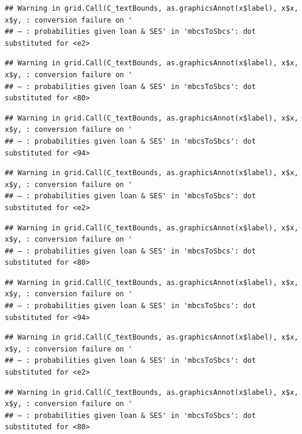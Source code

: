\documentclass[]{article}
\begin{document}
\begin{verbatim}
## Warning in grid.Call(C_textBounds, as.graphicsAnnot(x$label), x$x, x$y, : conversion failure on '
## — : probabilities given loan & SES' in 'mbcsToSbcs': dot substituted for <e2>
\end{verbatim}

\begin{verbatim}
## Warning in grid.Call(C_textBounds, as.graphicsAnnot(x$label), x$x, x$y, : conversion failure on '
## — : probabilities given loan & SES' in 'mbcsToSbcs': dot substituted for <80>
\end{verbatim}

\begin{verbatim}
## Warning in grid.Call(C_textBounds, as.graphicsAnnot(x$label), x$x, x$y, : conversion failure on '
## — : probabilities given loan & SES' in 'mbcsToSbcs': dot substituted for <94>
\end{verbatim}

\begin{verbatim}
## Warning in grid.Call(C_textBounds, as.graphicsAnnot(x$label), x$x, x$y, : conversion failure on '
## — : probabilities given loan & SES' in 'mbcsToSbcs': dot substituted for <e2>
\end{verbatim}

\begin{verbatim}
## Warning in grid.Call(C_textBounds, as.graphicsAnnot(x$label), x$x, x$y, : conversion failure on '
## — : probabilities given loan & SES' in 'mbcsToSbcs': dot substituted for <80>
\end{verbatim}

\begin{verbatim}
## Warning in grid.Call(C_textBounds, as.graphicsAnnot(x$label), x$x, x$y, : conversion failure on '
## — : probabilities given loan & SES' in 'mbcsToSbcs': dot substituted for <94>
\end{verbatim}

\begin{verbatim}
## Warning in grid.Call(C_textBounds, as.graphicsAnnot(x$label), x$x, x$y, : conversion failure on '
## — : probabilities given loan & SES' in 'mbcsToSbcs': dot substituted for <e2>
\end{verbatim}

\begin{verbatim}
## Warning in grid.Call(C_textBounds, as.graphicsAnnot(x$label), x$x, x$y, : conversion failure on '
## — : probabilities given loan & SES' in 'mbcsToSbcs': dot substituted for <80>
\end{verbatim}
\end{document}
